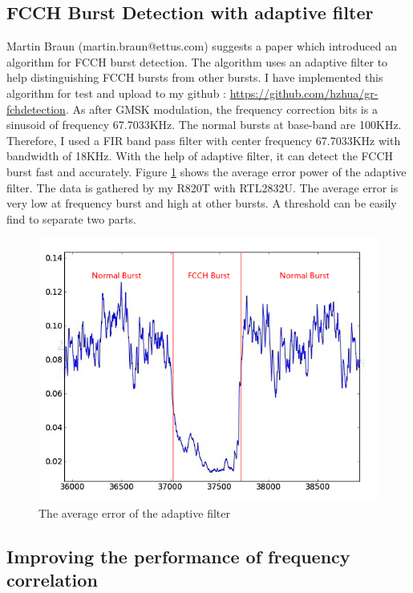 \documentclass[a4paper,12pt,oneside]{article}
\begin{document}
\subsection{FCCH Burst Detection with adaptive filter}
Martin Braun (martin.braun@ettus.com) suggests a paper \cite{1404796} which introduced an algorithm for FCCH burst detection. The algorithm uses an adaptive filter to help distinguishing FCCH bursts from other bursts. I have implemented this algorithm for test and upload to my github : {\color{blue}\url{https://github.com/hzhua/gr-fchdetection}}.
As after GMSK modulation, the frequency correction bits is a sinusoid of frequency 67.7033KHz. The normal bursts at base-band are 100KHz.
Therefore, I used a FIR band pass filter with center frequency 67.7033KHz with bandwidth of 18KHz. With the help of adaptive filter, it can detect
the FCCH burst fast and accurately. Figure \ref{fig:fch} shows the average error power of the adaptive filter. The data is gathered by my R820T with RTL2832U. The average error is very low
at frequency burst and high at other bursts. A threshold can be easily find to separate two parts.

\begin{figure}[!h]
\centering\includegraphics[width=5.4in]{figure/fcch_detect.png}
\caption{The average error of the adaptive filter\label{fig:fch}}
\end{figure}


\subsection{Improving the performance of frequency correlation}
\end{document}
